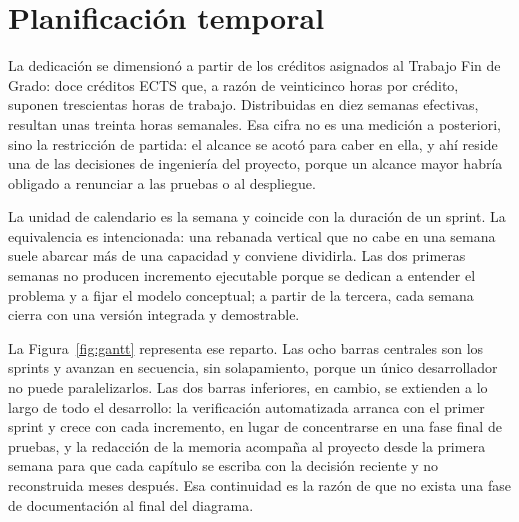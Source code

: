 \section{Planificación temporal}

La dedicación se dimensionó a partir de los créditos asignados al Trabajo Fin de Grado: doce créditos ECTS que, a razón de veinticinco horas por crédito, suponen trescientas horas de trabajo. Distribuidas en diez semanas efectivas, resultan unas treinta horas semanales. Esa cifra no es una medición a posteriori, sino la restricción de partida: el alcance se acotó para caber en ella, y ahí reside una de las decisiones de ingeniería del proyecto, porque un alcance mayor habría obligado a renunciar a las pruebas o al despliegue.

La unidad de calendario es la semana y coincide con la duración de un sprint. La equivalencia es intencionada: una rebanada vertical que no cabe en una semana suele abarcar más de una capacidad y conviene dividirla. Las dos primeras semanas no producen incremento ejecutable porque se dedican a entender el problema y a fijar el modelo conceptual; a partir de la tercera, cada semana cierra con una versión integrada y demostrable.

La Figura~\ref{fig:gantt} representa ese reparto. Las ocho barras centrales son los sprints y avanzan en secuencia, sin solapamiento, porque un único desarrollador no puede paralelizarlos. Las dos barras inferiores, en cambio, se extienden a lo largo de todo el desarrollo: la verificación automatizada arranca con el primer sprint y crece con cada incremento, en lugar de concentrarse en una fase final de pruebas, y la redacción de la memoria acompaña al proyecto desde la primera semana para que cada capítulo se escriba con la decisión reciente y no reconstruida meses después. Esa continuidad es la razón de que no exista una fase de documentación al final del diagrama.

